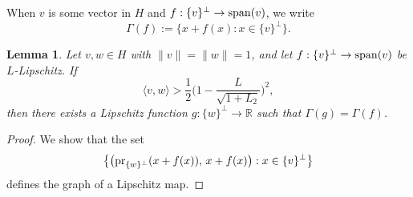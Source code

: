 \documentclass[a4paper]{amsart}
\numberwithin{theorem}{section}
\newtheorem{lemma}[theorem]{Lemma}
\theoremstyle{definition}
\begin{document}
When $v$ is some vector in $H$ and $f : \{ v \}^\perp \to {\rm span}(v)$, we write
\[
        \Gamma(f) := \{ x + f(x) : x \in \{ v \}^\perp \}.
\]

\begin{lemma} \label{lem.Lipschitz.graph}
    Let $v, w \in H$ with $\|v\| = \|w\| = 1$, and let $f : \{ v \}^\perp \to {\rm span}(v)$ be $L$-Lipschitz.
    If 
    \[
        \langle v,w \rangle > \frac12 \Big( 1 - \frac{L}{\sqrt{1 + L_2}}\Big)^2,
    \] 
    then there exists a Lipschitz function $g : \{ w \}^\perp \to \mathbb R$ such that $\Gamma(g) = \Gamma(f)$.
\end{lemma}

\begin{proof}
    We show that the set
    \begin{equation}
        \label{eq:lem.Lipschitz.graph}
        \big\{ \big({\rm pr}_{\{w\}^\perp}(x + f(x)), \, x + f(x) \big) : x \in \{v \}^\perp \big\}
    \end{equation}
    defines the graph of a Lipschitz map.
    

\end{proof}
\end{document}
